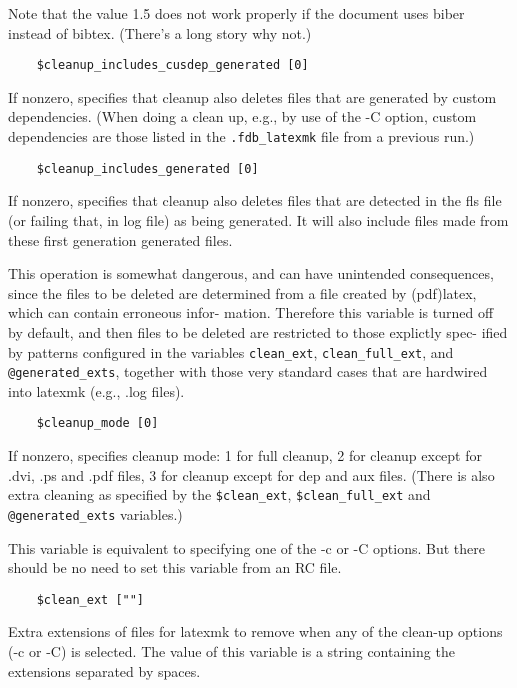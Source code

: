 Note  that  the value 1.5 does not work properly if the document
uses biber instead of bibtex.  (There's a long story why not.)

\begin{verbatim}
	$cleanup_includes_cusdep_generated [0]
\end{verbatim}

If nonzero, specifies that cleanup also deletes files  that  are
generated by custom dependencies.  (When doing a clean up, e.g.,
by use of the -C option, custom dependencies are those listed in
the \verb|.fdb_latexmk| file from a previous run.)

\begin{verbatim}
	$cleanup_includes_generated [0]
\end{verbatim}

If  nonzero,  specifies that cleanup also deletes files that are
detected in the fls file (or failing that, in log file) as being
generated.   It  will  also  include files made from these first
generation generated files.

This operation is somewhat dangerous, and  can  have  unintended
consequences,  since the files to be deleted are determined from
a file created by (pdf)latex, which can contain erroneous infor-
mation.  Therefore  this  variable is turned off by default, and
then files to be deleted are restricted to those explictly spec-
ified   by  patterns  configured  in  the  variables  \verb|clean_ext|,
\verb|clean_full_ext|, and \verb|@generated_exts|, together  with  those  very
standard  cases  that  are  hardwired  into  latexmk (e.g., .log
files).

\begin{verbatim}
	$cleanup_mode [0]
\end{verbatim}

If nonzero, specifies cleanup mode: 1 for full  cleanup,  2  for cleanup
except  for .dvi, .ps and .pdf files, 3 for cleanup except for dep and aux
files.  (There is also  extra  cleaning  as specified by the \verb|$clean_ext|,
\verb|$clean_full_ext| and \verb|@generated_exts| variables.)

This variable is equivalent to specifying one of the  -c  or  -C
options.   But there should be no need to set this variable from
an RC file.

\begin{verbatim}
	$clean_ext [""]
\end{verbatim}

Extra extensions of files for latexmk to remove when any of  the clean-up
options  (-c  or  -C)  is selected.  The value of this variable is a string
containing the extensions separated by spaces.


